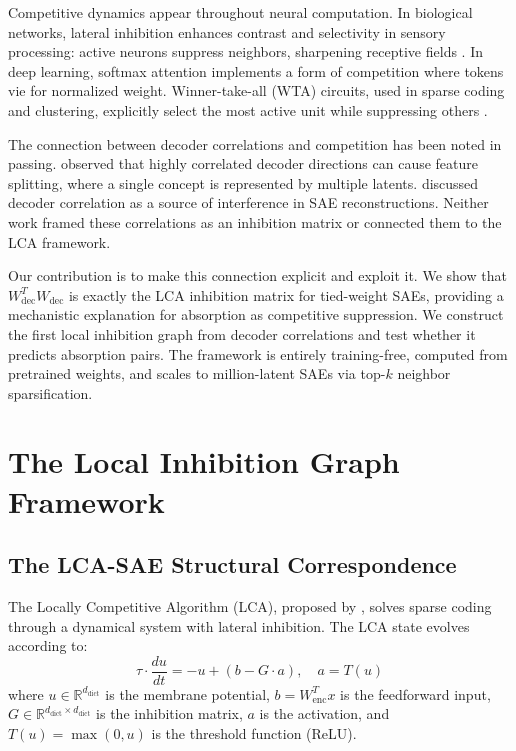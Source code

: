 \documentclass{article}
\begin{document}
Competitive dynamics appear throughout neural computation. In biological networks, lateral inhibition enhances contrast and selectivity in sensory processing: active neurons suppress neighbors, sharpening receptive fields \citep{hartline1957inhibitory}. In deep learning, softmax attention implements a form of competition where tokens vie for normalized weight. Winner-take-all (WTA) circuits, used in sparse coding and clustering, explicitly select the most active unit while suppressing others \citep{makhzani2015winner}.

The connection between decoder correlations and competition has been noted in passing. \citet{schubert2023open} observed that highly correlated decoder directions can cause feature splitting, where a single concept is represented by multiple latents. \citet{lieberum2023open} discussed decoder correlation as a source of interference in SAE reconstructions. Neither work framed these correlations as an inhibition matrix or connected them to the LCA framework.

Our contribution is to make this connection explicit and exploit it. We show that $W_{\text{dec}}^T W_{\text{dec}}$ is exactly the LCA inhibition matrix for tied-weight SAEs, providing a mechanistic explanation for absorption as competitive suppression. We construct the first local inhibition graph from decoder correlations and test whether it predicts absorption pairs. The framework is entirely training-free, computed from pretrained weights, and scales to million-latent SAEs via top-$k$ neighbor sparsification.

\section{The Local Inhibition Graph Framework}
\label{sec:framework}

\subsection{The LCA-SAE Structural Correspondence}
\label{sec:structural-correspondence}

The Locally Competitive Algorithm (LCA), proposed by \citet{rozell2008sparse}, solves sparse coding through a dynamical system with lateral inhibition. The LCA state evolves according to:
\begin{equation}
\tau \cdot \frac{du}{dt} = -u + (b - G \cdot a), \quad a = T(u)
\end{equation}
where $u \in \mathbb{R}^{d_{\text{dict}}}$ is the membrane potential, $b = W_{\text{enc}}^T x$ is the feedforward input, $G \in \mathbb{R}^{d_{\text{dict}} \times d_{\text{dict}}}$ is the inhibition matrix, $a$ is the activation, and $T(u) = \max(0, u)$ is the threshold function (ReLU).
\end{document}
